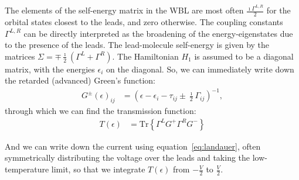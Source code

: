 The elements of the self-energy matrix in the WBL are most often $\frac{\imath \Gamma^{L,R}}{2}$ for the orbital states closest to the leads, and zero otherwise. The coupling constants $\Gamma^{L,R}$ can be directly interpreted as the broadening of the energy-eigenstates due to the presence of the leads. The lead-molecule self-energy is given by the matrices $\Sigma = \mp \frac{\imath}{2} \left( \Gamma^L + \Gamma^R \right)$. The Hamiltonian $H_1$ is assumed to be a diagonal matrix, with the energies $\epsilon_i$ on the diagonal. So, we can immediately write down the retarded (advanced) Green's function:
\begin{align}
G^\pm(\epsilon)_{ij} &= \left(\epsilon - \epsilon_i - \tau_{ij} \pm \frac{\imath}{2} \Gamma_{ij}\right)^{-1}
\label{eq:commongf},
\end{align}
through which we can find the transmission function:
\begin{align}
T(\epsilon) &= \text{Tr}\left\{\Gamma^L G^+ \Gamma^R G^-\right\}
\label{eq:commonte}
\end{align}

And we can write down the current using equation~\ref{eq:landauer}, often symmetrically distributing the voltage over the leads and taking the low-temperature limit, so that we integrate $T(\epsilon)$ from $-\frac{V}{2}$ to $\frac{V}{2}$. 



